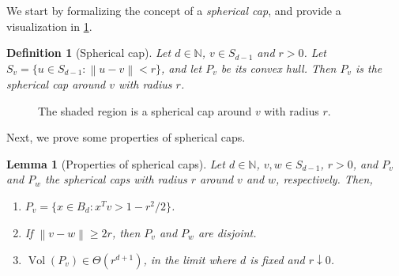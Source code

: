 \documentclass[11pt]{article}
\newtheorem{definition}[theorem]{Definition}
\newtheorem{lemma}[theorem]{Lemma}
\newcommand{\N}{\ensuremath{\mathbb{N}}}
\newcommand{\norm}[1]{\ensuremath{\left\|#1\right\|}}
\DeclareMathOperator{\Vol}{Vol}
\begin{document}
    We start by formalizing the concept of a \textit{spherical cap}, and provide a visualization in \cref{fig:delta-patch}.

    \begin{definition}[Spherical cap]
        Let $d \in \N$, $v \in S_{d-1}$ and $r > 0$. Let $S_v = \{u \in S_{d-1} : \norm{u-v} < r\}$, and let $P_v$ be its convex hull. Then $P_v$ is the spherical cap around $v$ with radius $r$.
    \end{definition}

    \begin{figure}[!ht]
        \centering
        \caption{The shaded region is a spherical cap around $v$ with radius $r$.}
        \label{fig:delta-patch}
    \end{figure}

    Next, we prove some properties of spherical caps.

    \begin{lemma}[Properties of spherical caps]
        \label{lem:spherical-patches-properties}
        Let $d \in \N$, $v,w \in S_{d-1}$, $r > 0$, and $P_v$ and $P_w$ the spherical caps with radius $r$ around $v$ and $w$, respectively. Then,
        \begin{enumerate}[nosep]
            \item $P_v = \{x \in B_d : x^Tv > 1-r^2/2\}$.
            \item If $\norm{v-w} \geq 2r$, then $P_v$ and $P_w$ are disjoint.
            \item $\Vol(P_v) \in \Theta(r^{d+1})$, in the limit where $d$ is fixed and $r \downarrow 0$.
        \end{enumerate}
    \end{lemma}
\end{document}
